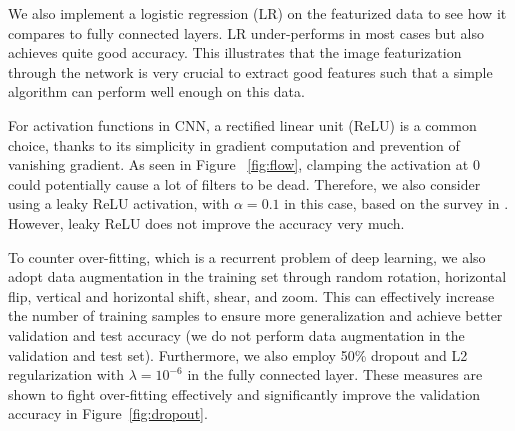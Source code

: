 \documentclass[journal, 12pt, onecolumn,draftclsnofoot]{IEEEtran}
\begin{document}
We also implement a logistic regression (LR) on the featurized data to see how it compares to fully connected layers. LR under-performs in most cases but also achieves quite good accuracy. This illustrates that the image featurization through the network is very crucial to extract good features such that a simple algorithm can perform well enough on this data. 

For activation functions in CNN, a rectified linear unit (ReLU) is a common choice, thanks to its simplicity in gradient computation and prevention of vanishing gradient. As seen in  Figure ~\ref{fig:flow}, clamping the activation at $0$ could potentially cause a lot of filters to be dead. Therefore, we also consider using a leaky ReLU activation, with  $\alpha = 0.1$ in this case, based on the survey in \cite{leaky}. However, leaky ReLU does not improve the accuracy very much. 

To counter over-fitting, which is a recurrent problem of deep learning, we also adopt data augmentation in the training set through random rotation, horizontal flip, vertical and horizontal shift, shear, and zoom. This can effectively increase the number of training samples to ensure more generalization and achieve better validation and test accuracy (we do not perform data augmentation in the validation and test set). Furthermore, we also employ 50\% dropout and L2 regularization with $\lambda = 10^{-6}$ in the fully connected layer. These measures are shown to fight over-fitting effectively and significantly improve the validation accuracy in Figure~\ref{fig:dropout}.

\begin{figure}[h]
\end{figure}
\end{document}
